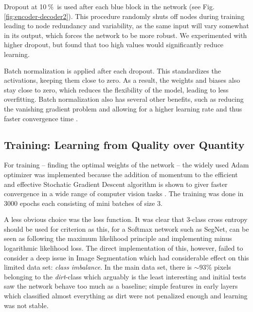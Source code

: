 \documentclass{article}
\newcommand{\pro}{\ensuremath{\ \%}}
\begin{document}
Dropout at 10\pro\ is used after each blue block in the network (see Fig. \ref{fig:encoder-decoder2}).
This procedure randomly shuts off nodes during training leading to node redundancy and variability, as the same input will vary somewhat in its output, which forces the network to be more robust.
We experimented with higher dropout, but found that too high values would significantly reduce learning.

Batch normalization is applied after each dropout.
This standardizes the activations, keeping them close to zero.
As a result, the weights and biases also stay close to zero, which reduces the flexibility of the model, leading to less overfitting.
Batch normalization also has several other benefits, such as reducing the vanishing gradient problem and allowing for a higher learning rate and thus faster convergence time \cite{bn}. 

\subsection{Training: Learning from Quality over Quantity}
For training -- finding the optimal weights of the network -- the widely used Adam optimizer  was implemented because the addition of momentum to the efficient and effective Stochatic Gradient Descent algorithm is shown to giver faster convergence in a wide range of computer vision tasks \cite{Adam}. The training was done in 3000 epochs each consisting of mini batches of size 3.

A less obvious choice was the loss function. It was clear that 3-class cross entropy should be used for criterion as this, for a Softmax network such as SegNet, can be seen as following the maximum likelihood principle and implementing minus logarithmic likelihood loss. The direct implementation of this, however, failed to consider a deep issue in Image Segmentation which had considerable effect on this limited data set: \textit{class imbalance}. 
In the main data set, there is \(\sim 93 \%\) pixels belonging to the \textit{dirt}-class which arguably is the least interesting and initial tests saw the network behave too much as a baseline; simple features in early layers which classified almost everything as dirt were not penalized enough and learning was not stable. 
\end{document}
